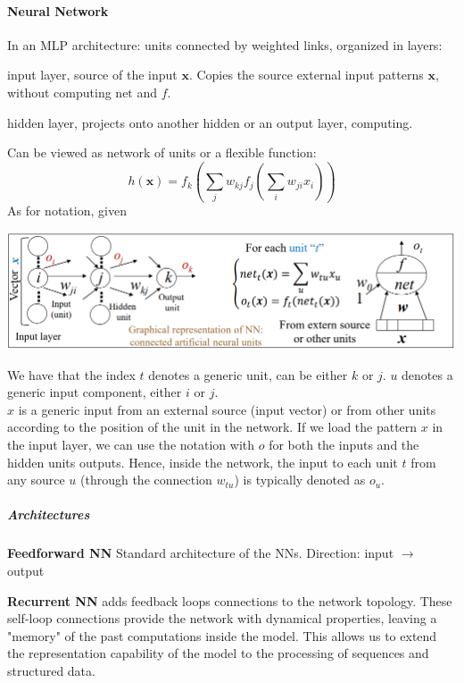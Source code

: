 \documentclass[10pt]{report}
\begin{document}
\paragraph{Neural Network} In an MLP architecture: units connected by weighted links, organized in layers:
\begin{list}{}{}
	\item input layer, source of the input $\mathbf{x}$. Copies the source external input patterns $\mathbf{x}$, without computing $\text{net}$ and $f$.
	\item hidden layer, projects onto another hidden or an output layer, computing.
\end{list}
Can be viewed as network of units or a flexible function:
$$h(\mathbf{x}) = f_k\left(\sum_j w_{kj}f_j\left(\sum_i w_{ji}x_i\right)\right)$$
As for notation, given
\begin{center}
	\includegraphics[scale=0.6]{7.png}
\end{center}
We have that the index $t$ denotes a generic unit, can be either $k$ or $j$. $u$ denotes a generic input component, either $i$ or $j$.\\
$x$ is a generic input from an external source (input vector) or from other units according to the position of the unit in the network. If we load the pattern $x$ in the input layer, we can use the notation with $o$ for both the inputs and the hidden units outputs. Hence, inside the network, the input to each unit $t$ from any source $u$ (through the connection $w_{tu}$) is typically denoted as $o_u$.
\subparagraph{Architectures}
\begin{list}{}{}
	\item \textbf{Feedforward NN} Standard architecture of the NNs. Direction: input $\longrightarrow$ output
	\item \textbf{Recurrent NN} adds feedback loops connections to the network topology. These self-loop connections provide the network with dynamical properties, leaving a "memory" of the past computations inside the model. This allows us to extend the representation capability of the model to the processing of sequences and structured data.
\end{list}
\end{document}
